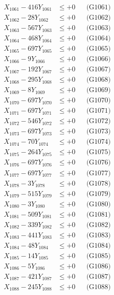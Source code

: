\documentclass[a4paper,10pt]{article}
\begin{document}
{\begin{align}
\allowbreak
X_{1061} - 416Y_{1061} &\leq +0 && \text{(G1061)} \\
X_{1062} - 28Y_{1062} &\leq +0 && \text{(G1062)} \\
X_{1063} - 567Y_{1063} &\leq +0 && \text{(G1063)} \\
X_{1064} - 468Y_{1064} &\leq +0 && \text{(G1064)} \\
X_{1065} - 697Y_{1065} &\leq +0 && \text{(G1065)} \\
X_{1066} - 9Y_{1066} &\leq +0 && \text{(G1066)} \\
X_{1067} - 192Y_{1067} &\leq +0 && \text{(G1067)} \\
X_{1068} - 295Y_{1068} &\leq +0 && \text{(G1068)} \\
X_{1069} - 8Y_{1069} &\leq +0 && \text{(G1069)} \\
X_{1070} - 697Y_{1070} &\leq +0 && \text{(G1070)} \\
\allowbreak
X_{1071} - 697Y_{1071} &\leq +0 && \text{(G1071)} \\
X_{1072} - 546Y_{1072} &\leq +0 && \text{(G1072)} \\
X_{1073} - 697Y_{1073} &\leq +0 && \text{(G1073)} \\
X_{1074} - 70Y_{1074} &\leq +0 && \text{(G1074)} \\
X_{1075} - 264Y_{1075} &\leq +0 && \text{(G1075)} \\
X_{1076} - 697Y_{1076} &\leq +0 && \text{(G1076)} \\
X_{1077} - 697Y_{1077} &\leq +0 && \text{(G1077)} \\
X_{1078} - 3Y_{1078} &\leq +0 && \text{(G1078)} \\
X_{1079} - 515Y_{1079} &\leq +0 && \text{(G1079)} \\
X_{1080} - 3Y_{1080} &\leq +0 && \text{(G1080)} \\
\allowbreak
X_{1081} - 509Y_{1081} &\leq +0 && \text{(G1081)} \\
X_{1082} - 339Y_{1082} &\leq +0 && \text{(G1082)} \\
X_{1083} - 441Y_{1083} &\leq +0 && \text{(G1083)} \\
X_{1084} - 48Y_{1084} &\leq +0 && \text{(G1084)} \\
X_{1085} - 14Y_{1085} &\leq +0 && \text{(G1085)} \\
X_{1086} - 5Y_{1086} &\leq +0 && \text{(G1086)} \\
X_{1087} - 421Y_{1087} &\leq +0 && \text{(G1087)} \\
X_{1088} - 245Y_{1088} &\leq +0 && \text{(G1088)} \\

\end{align}}
\end{document}
